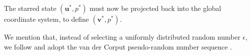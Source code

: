 \documentclass[review]{elsarticle}
\begin{document}
The starred state $(\textbf{u}^{\ast},  p^{\ast})$ must now be projected back into the global coordinate system,
to define  $(\textbf{v}^{\ast},  p^{\ast})$.

 We mention that, instead of selecting a uniformly distributed random number $\epsilon$, 
 we follow \citet{colella1982glimm} and
 adopt the van der Corput pseudo-random number sequence \citep{hammersley2013monte}.


 
\end{document}
